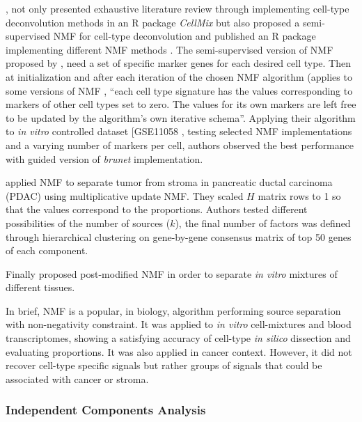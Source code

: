 \documentclass[12pt,]{book}
\theoremstyle{definition}
\theoremstyle{definition}
\theoremstyle{definition}
\theoremstyle{remark}
\begin{document}
\citet{Shen-Orr2013}, not only presented exhaustive literature review
through implementing cell-type deconvolution methods in an R package
\emph{CellMix} \citep{Gaujoux2013} but also proposed a semi-supervised
NMF for cell-type deconvolution and published an R package implementing
different NMF methods \citep{Gaujoux2010}. The semi-supervised version
of NMF proposed by \citet{Gaujoux2013}, need a set of specific marker
genes for each desired cell type. Then at initialization and after each
iteration of the chosen NMF algorithm (applies to some versions of NMF
\citep{Seung1999, Brunet2004, PascualMontano2006}, ``each cell type
signature has the values corresponding to markers of other cell types
set to zero. The values for its own markers are left free to be updated
by the algorithm's own iterative schema''. Applying their algorithm to
\emph{in vitro} controlled dataset {[}GSE11058 \citep{Abbas2009},
testing selected NMF implementations and a varying number of markers per
cell, authors observed the best performance with guided version of
\emph{brunet} \citep{Brunet2004} implementation.

\citet{Moffitt2015} applied NMF to separate tumor from stroma in
pancreatic ductal carcinoma (PDAC) using multiplicative update NMF. They
scaled \(H\) matrix rows to 1 so that the values correspond to the
proportions. Authors tested different possibilities of the number of
sources (\(k\)), the final number of factors was defined through
hierarchical clustering on gene-by-gene consensus matrix of top 50 genes
of each component.

Finally \citet{Liu2017} proposed post-modified NMF in order to separate
\emph{in vitro} mixtures of different tissues.

In brief, NMF is a popular, in biology, algorithm performing source
separation with non-negativity constraint. It was applied to \emph{in
vitro} cell-mixtures and blood transcriptomes, showing a satisfying
accuracy of cell-type \emph{in silico} dissection and evaluating
proportions. It was also applied in cancer context. However, it did not
recover cell-type specific signals but rather groups of signals that
could be associated with cancer or stroma.

\hypertarget{independent-components-analysis}{%
\subsubsection{Independent Components
Analysis}\label{independent-components-analysis}}
\end{document}
